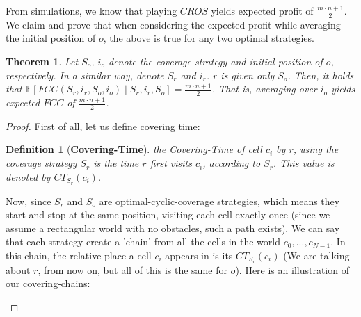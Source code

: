 \documentclass[a4paper,10pt]{article}
\newtheorem{theorem}{Theorem}[section]
\newcommand\rob{\ensuremath{r}\xspace}
\newcommand\opp{\ensuremath{o}\xspace}
\newcommand{\fcc}{\ensuremath{FCC}\xspace}
\newcommand{\cros}{\ensuremath{CROS}\xspace}
\newtheorem{definition}{Definition}
\begin{document}
From simulations, we know that playing \cros yields expected profit of $\frac{m\cdot n+1}{2}$. We claim and prove that when considering the expected profit while averaging the initial position of \opp, the above is true for any two optimal strategies.
\begin{theorem}\label{theorems:expected FCC, only So known}
Let $S_{\opp}$, $i_{\opp}$ denote the coverage strategy and initial position of \opp, respectively. In a similar way, denote $S_{\rob}$ and $i_r$. \rob is given only $S_{\opp}$. Then, it holds that $\mathbb{E}\left[\fcc\left(S_{\rob}, i_r, S_{\opp}, i_{\opp}\right) \mid S_{\rob}, i_r, S_{\opp}\right]=\frac{m\cdot n+1}{2}$. That is, averaging over $i_{\opp}$ yields expected \fcc of $\frac{m\cdot n+1}{2}$.
\end{theorem}
\begin{proof}
First of all, let us define covering time: 
\begin{definition}[\textbf{Covering-Time}]
the Covering-Time of cell $c_i$ by \rob, using the coverage strategy $S_{\rob}$ is the time \rob first visits $c_i$, according to $S_{\rob}$. This value is denoted by ${CT}_{S_{\rob}}(c_i)$.
\end{definition}
Now, since $S_{\rob}$ and $S_{\opp}$ are optimal-cyclic-coverage strategies, which means they start and stop at the same position, visiting each cell exactly once (since we assume a rectangular world with no obstacles, such a path exists). We can say that each strategy create a 'chain' from all the cells in the world $c_0,...,c_{N-1}$. In this chain, the relative place a cell $c_i$ appears in is its ${CT}_{S_{\rob}}(c_i)$ (We are talking about \rob,  from now on, but all of this is the same for \opp). Here is an illustration of our covering-chains:
\begin{figure}
\centering
{}


\end{figure}
\end{proof}
\end{document}
